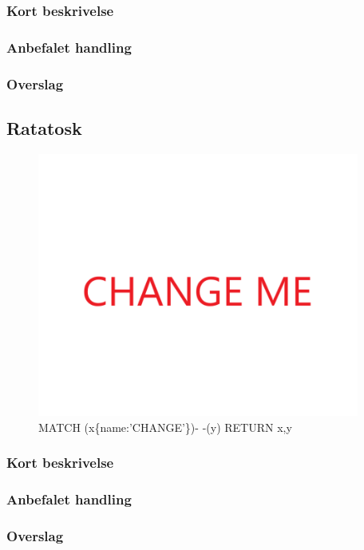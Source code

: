 \documentclass{article}
\begin{document}
\subsubsection{Kort beskrivelse}
\subsubsection{Anbefalet handling}
\subsubsection{Overslag}


\subsection{Ratatosk}
\begin{figure}[h]
\includegraphics[width=300pt]{CHANGE.PNG}
\caption{MATCH (x\{name:'CHANGE'\})- -(y) RETURN x,y}
\end{figure}
\subsubsection{Kort beskrivelse}
\subsubsection{Anbefalet handling}
\subsubsection{Overslag}
\end{document}
